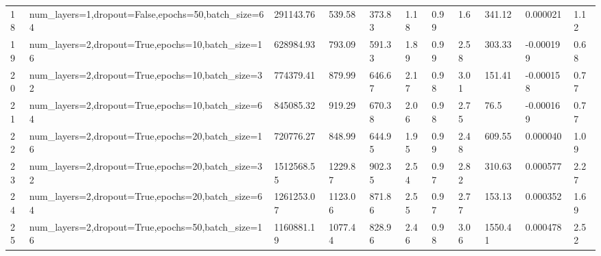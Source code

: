 \begin{longtable}{C{0.8cm} L{2cm} C{1.15cm} C{1.15cm} C{1.15cm} C{1.15cm} C{0.85cm} C{1.25cm} C{1.2cm} C{1.5cm} C{1.0cm}}
18 & num\_layers=1,\newline dropout=False,\newline epochs=50,\newline batch\_size=64 & 291143.76 & 539.58 & 373.83 & 1.18 & 0.99 & 1.6 & 341.12 & 0.000021 & 1.12 \\
19 & num\_layers=2,\newline dropout=True,\newline epochs=10,\newline batch\_size=16 & 628984.93 & 793.09 & 591.33 & 1.89 & 0.99 & 2.58 & 303.33 & -0.000199 & 0.68 \\
20 & num\_layers=2,\newline dropout=True,\newline epochs=10,\newline batch\_size=32 & 774379.41 & 879.99 & 646.67 & 2.17 & 0.98 & 3.01 & 151.41 & -0.000158 & 0.77 \\
21 & num\_layers=2,\newline dropout=True,\newline epochs=10,\newline batch\_size=64 & 845085.32 & 919.29 & 670.38 & 2.06 & 0.98 & 2.75 & 76.5 & -0.000169 & 0.77 \\
22 & num\_layers=2,\newline dropout=True,\newline epochs=20,\newline batch\_size=16 & 720776.27 & 848.99 & 644.95 & 1.95 & 0.99 & 2.48 & 609.55 & 0.000040 & 1.09 \\
23 & num\_layers=2,\newline dropout=True,\newline epochs=20,\newline batch\_size=32 & 1512568.55 & 1229.87 & 902.35 & 2.54 & 0.97 & 2.82 & 310.63 & 0.000577 & 2.27 \\
24 & num\_layers=2,\newline dropout=True,\newline epochs=20,\newline batch\_size=64 & 1261253.07 & 1123.06 & 871.86 & 2.55 & 0.97 & 2.77 & 153.13 & 0.000352 & 1.69 \\
25 & num\_layers=2,\newline dropout=True,\newline epochs=50,\newline batch\_size=16 & 1160881.19 & 1077.44 & 828.96 & 2.46 & 0.98 & 3.06 & 1550.41 & 0.000478 & 2.52 \\

\end{longtable}
